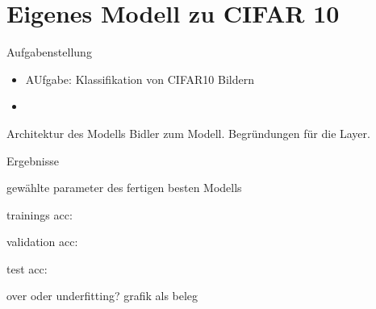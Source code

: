 \section{Eigenes Modell zu CIFAR 10}

\begin{frame}{Aufgabenstellung}
    \begin{itemize}
        \item AUfgabe: Klassifikation von CIFAR10 Bildern
        \item 
    \end{itemize}

\end{frame}

\begin{frame}{Architektur des Modells}
    Bidler zum Modell. Begründungen für die Layer.

\end{frame}

\begin{frame}{Ergebnisse}

    gewählte parameter des fertigen besten Modells

    trainings acc:

    validation acc:

    test acc:

    over oder underfitting? grafik als beleg

    

\end{frame}
